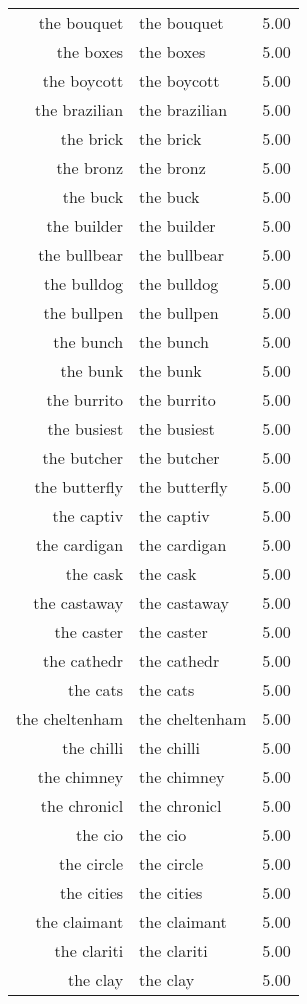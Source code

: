 \begin{table}[ht]
\begin{tabular}{rlr}
  the bouquet & the bouquet & 5.00 \\ 
  the boxes & the boxes & 5.00 \\ 
  the boycott & the boycott & 5.00 \\ 
  the brazilian & the brazilian & 5.00 \\ 
  the brick & the brick & 5.00 \\ 
  the bronz & the bronz & 5.00 \\ 
  the buck & the buck & 5.00 \\ 
  the builder & the builder & 5.00 \\ 
  the bullbear & the bullbear & 5.00 \\ 
  the bulldog & the bulldog & 5.00 \\ 
  the bullpen & the bullpen & 5.00 \\ 
  the bunch & the bunch & 5.00 \\ 
  the bunk & the bunk & 5.00 \\ 
  the burrito & the burrito & 5.00 \\ 
  the busiest & the busiest & 5.00 \\ 
  the butcher & the butcher & 5.00 \\ 
  the butterfly & the butterfly & 5.00 \\ 
  the captiv & the captiv & 5.00 \\ 
  the cardigan & the cardigan & 5.00 \\ 
  the cask & the cask & 5.00 \\ 
  the castaway & the castaway & 5.00 \\ 
  the caster & the caster & 5.00 \\ 
  the cathedr & the cathedr & 5.00 \\ 
  the cats & the cats & 5.00 \\ 
  the cheltenham & the cheltenham & 5.00 \\ 
  the chilli & the chilli & 5.00 \\ 
  the chimney & the chimney & 5.00 \\ 
  the chronicl & the chronicl & 5.00 \\ 
  the cio & the cio & 5.00 \\ 
  the circle & the circle & 5.00 \\ 
  the cities & the cities & 5.00 \\ 
  the claimant & the claimant & 5.00 \\ 
  the clariti & the clariti & 5.00 \\ 
  the clay & the clay & 5.00 \\ 

\end{tabular}
\end{table}
